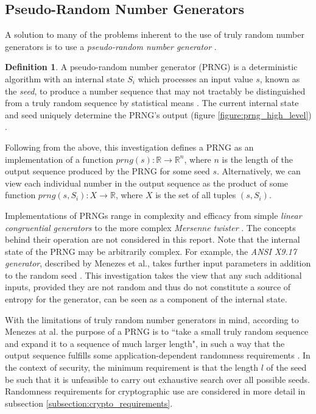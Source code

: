 \documentclass[12pt, titlepage]{report}
\theoremstyle{definition}
\newtheorem{definition}{Definition}
\begin{document}
\subsection{Pseudo-Random Number Generators}\label{subsection:prngs}
A solution to many of the problems inherent to the use of truly random number generators is to use a \emph{pseudo-random number generator} \cite[p. 140]{ferguson2010cryptography}.

\begin{definition}
A pseudo-random number generator (PRNG) is a deterministic algorithm with an internal state $S_i$ \cite[p. 2]{kelsey1998cryptanalytic} which processes an input value $s$, known as the \emph{seed}, to produce a number sequence that may not tractably be distinguished from a truly random sequence by statistical means \cite[p. 170]{menezes1996handbook}. The current internal state and seed uniquely determine the PRNG's output (figure \ref{figure:prng_high_level}) \cite[p. 2]{kelsey1998cryptanalytic} \cite[s 1.1.4]{rukhin2001statistical}.

Following from the above, this investigation defines a PRNG as an implementation of a function $prng(s) : \mathbb{R} \rightarrow \mathbb{R}^n$, where $n$ is the length of the output sequence produced by the PRNG for some seed $s$. Alternatively, we can view each individual number in the output sequence as the product of some function $prng(s, S_i) : X \rightarrow \mathbb{R}$, where $X$ is the set of all tuples $(s, S_i)$.
\end{definition}

Implementations of PRNGs range in complexity and efficacy from simple \emph{linear congruential generators} \cite[p. 170]{menezes1996handbook} to the more complex \emph{Mersenne twister} \cite{matsumoto1998mersenne}. The concepts behind their operation are not considered in this report. Note that the internal state of the PRNG may be arbitrarily complex. For example, the \emph{ANSI X9.17 generator}, described by Menezes et al., takes further input parameters in addition to the random seed \cite[p. 173]{menezes1996handbook}. This investigation takes the view that any such additional inputs, provided they are not random and thus do not constitute a source of entropy for the generator, can be seen as a component of the internal state.

With the limitations of truly random number generators in mind, according to Menezes at al. the purpose of a PRNG is to ``take a small truly random sequence and expand it to a sequence of much larger length", in such a way that the output sequence fulfills some application-dependent randomness requirements \cite[p. 170]{menezes1996handbook}. In the context of security, the minimum requirement is that the length $l$ of the seed be such that it is unfeasible to carry out exhaustive search over all possible seeds. Randomness requirements for cryptographic use are considered in more detail in subsection \ref{subsection:crypto_requirements}.
\end{document}
